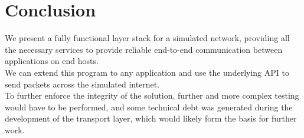 \section{Conclusion}
We present a fully functional layer stack for a simulated network, providing all the necessary services to provide reliable end-to-end communication between applications on end hosts.\\
We can extend this program to any application and use the underlying API to send packets across the simulated internet.\\
To further enforce the integrity of the solution, further and more complex testing would have to be performed, and some technical debt was generated during the development of the transport layer, which would likely form the basis for further work.
